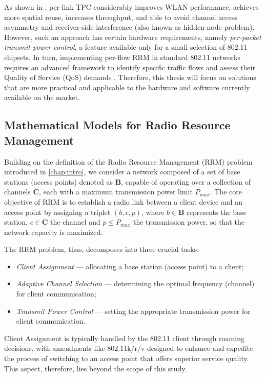 As shown in \cite{ramachandranSymphonySynchronousTwophase2008}, per-link TPC considerably improves WLAN performance, achieves more spatial reuse, increases throughput, and able to avoid channel access asymmetry and receiver-side interference (also known as hidden-node problem). However, such an approach has certain hardware requirements, namely \textit{per-packet transmit power control}, a feature available only for a small selection of 802.11 chipsets.
In turn, implementing per-flow RRM in standard 802.11 networks requires an advanced framework to identify specific traffic flows and assess their Quality of Service (QoS) demands \cite{bouhafsPerFlowRadioResource2020}. Therefore, this thesis will focus on solutions that are more practical and applicable to the hardware and software currently available on the market.

\subsection{Mathematical Models for Radio Resource Management}
\label{chap:lr:sec:math_models}

Building on the definition of the Radio Resource Management (RRM) problem introduced in \ref{chap:intro}, we consider a network composed of a set of base stations (access points) denoted as $\boldsymbol{B}$, capable of operating over a collection of channels $\boldsymbol{C}$, each with a maximum transmission power limit $P_{max}$. The core objective of RRM is to establish a radio link between a client device and an access point by assigning a triplet $(b, c, p)$, where $b \in \boldsymbol{B}$ represents the base station, $c \in \boldsymbol{C}$ the channel and $p \leq P_{max}$ the transmission power, so that the network capacity is maximized.

The RRM problem, thus, decomposes into three crucial tasks:
\begin{itemize}
\item \textit{Client Assignment} --- allocating a base station (access point) to a client;
\item \textit{Adaptive Channel Selection} --- determining the optimal frequency (channel) for client communication;
\item \textit{Transmit Power Control} --- setting the appropriate transmission power for client communication.
\end{itemize}

Client Assignment is typically handled by the 802.11 client through roaming decisions, with amendments like 802.11k/r/v designed to enhance and expedite the process of switching to an access point that offers superior service quality. This aspect, therefore, lies beyond the scope of this study.

